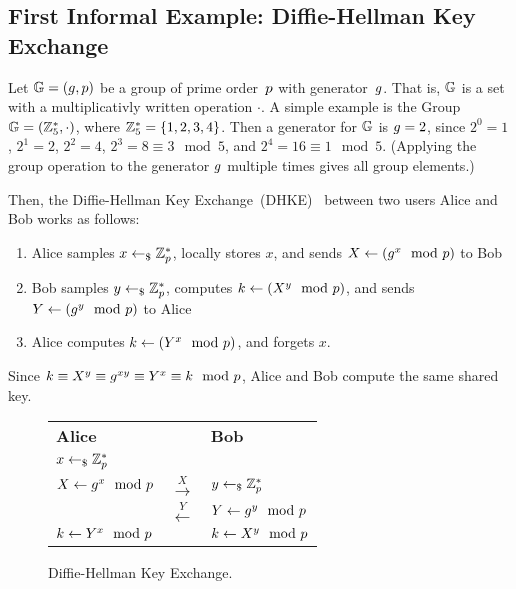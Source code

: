 \subsection{First Informal Example: Diffie-Hellman Key Exchange}
\label{sec:overview:dhke}


Let $\mathbb{G}=(g,p)$ be a group of prime order~$p$ with generator~$g$.
That is, $\mathbb{G}$ is a set with a multiplicativly written operation $\cdot$. A
simple example is the Group $\mathbb{G}=(\mathbb{Z}_5^*,\cdot)$, where $\mathbb{Z}_5^* =
\{1,2,3,4\}$. Then a generator for $\mathbb{G}$ is $g=2$, since $2^0=1$, $2^1=2$,
$2^2=4$, $2^3=8\equiv3\mod 5$, and $2^4=16\equiv 1\mod 5$. (Applying the
group operation to the generator $g$ multiple times gives all group elements.)

Then, the Diffie-Hellman Key Exchange~(DHKE)~\cite{DifHel76}
between two users Alice and Bob works as follows:
\begin{enumerate}
    \item Alice samples $x\gets_\$\mathbb{Z}_p^*$, locally stores $x$, and sends $X\gets(g^x\mod{p})$ to Bob
    \item Bob samples $y\gets_\$\mathbb{Z}_p^*$, computes $k\gets(X^y\mod{p})$, and sends $Y\gets(g^y\mod{p})$ to Alice
    \item Alice computes $k\gets(Y^x\mod{p})$, and forgets $x$.
\end{enumerate}
Since $k\equiv X^y\equiv g^{xy}\equiv Y^x\equiv k\mod {p}$, Alice and Bob compute the same shared key.

\begin{figure}
    \centering
    \begin{tabular}{lC{3cm}l}
        \textbf{Alice} & & \textbf{Bob}\\
        $x\gets_\$\mathbb{Z}_p^*$ & &\\
        $X\gets g^x\mod{p}$ & $\xrightarrow{X}$ & $y\gets_\$\mathbb{Z}_p^*$\\
        & $\xleftarrow{Y}$ & $Y\gets g^y\mod{p}$\\
        $k\gets Y^x\mod{p}$ & & $k\gets X^y\mod{p}$\\
    \end{tabular}
    \caption{Diffie-Hellman Key Exchange.}
    \label{fig:dhke}
\end{figure}

